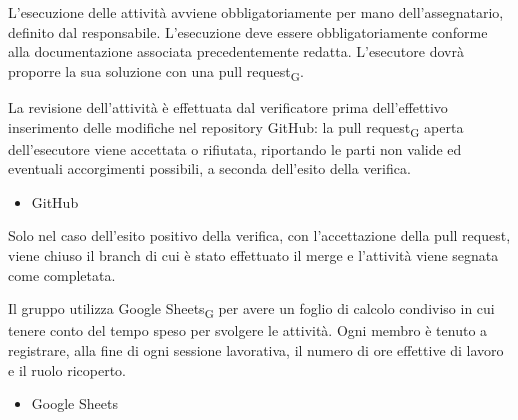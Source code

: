 L'esecuzione delle attività avviene obbligatoriamente per mano dell'assegnatario, definito dal responsabile. L'esecuzione deve essere obbligatoriamente conforme alla documentazione associata precedentemente redatta. L'esecutore dovrà proporre la sua soluzione con una pull request\textsubscript{G}.

La revisione dell'attività è effettuata dal verificatore prima dell'effettivo inserimento delle modifiche nel repository GitHub: la pull request\textsubscript{G} aperta dell'esecutore viene accettata o rifiutata, riportando le parti non valide ed eventuali accorgimenti possibili, a seconda dell'esito della verifica.
    \begin{itemize}
        \item GitHub
    \end{itemize}

Solo nel caso dell'esito positivo della verifica, con l'accettazione della pull request, viene chiuso il branch di cui è stato effettuato il merge e l'attività viene segnata come completata. 

Il gruppo utilizza Google Sheets\textsubscript{G} per avere un foglio di calcolo condiviso in cui tenere conto del tempo speso per svolgere le attività. Ogni membro è tenuto a registrare, alla fine di ogni sessione lavorativa, il numero di ore effettive di lavoro e il ruolo ricoperto.
    \begin{itemize}
        \item Google Sheets
    \end{itemize}


